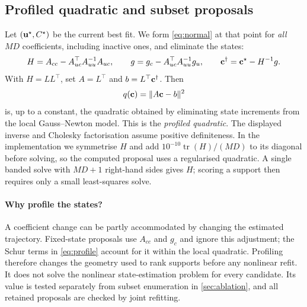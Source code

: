 \subsection{Profiled quadratic and subset proposals}
\label{sec:proposals}
Let $(\mathbf{u}^\star, C^\star)$ be the current best fit. We form \eqref{eq:normal} at that point for \emph{all} $MD$ coefficients, including inactive ones, and eliminate the states:
\begin{equation}
H = A_{cc}-A_{uc}^\top A_{uu}^{-1}A_{uc},\qquad g = g_c - A_{uc}^\top A_{uu}^{-1}g_u,\qquad
\mathbf{c}^\dagger = \mathbf{c}^\star - H^{-1}g .
\label{eq:profile}
\end{equation}
With $H=LL^\top$, set $A=L^\top$ and $b=L^\top\mathbf{c}^\dagger$. Then
\begin{equation}
q(\mathbf{c}) = \lVert A\mathbf{c}-b\rVert^2
\end{equation}
is, up to a constant, the quadratic obtained by eliminating state increments from the local Gauss--Newton model. This is the \emph{profiled quadratic}. The displayed inverse and Cholesky factorisation assume positive definiteness. In the implementation we symmetrise $H$ and add $10^{-10}\operatorname{tr}(H)/(MD)$ to its diagonal before solving, so the computed proposal uses a regularised quadratic. A single banded solve with $MD+1$ right-hand sides gives $H$; scoring a support then requires only a small least-squares solve.

\paragraph{Why profile the states?} A coefficient change can be partly accommodated by changing the estimated trajectory. Fixed-state proposals use $A_{cc}$ and $g_c$ and ignore this adjustment; the Schur terms in \eqref{eq:profile} account for it within the local quadratic. Profiling therefore changes the geometry used to rank supports before any nonlinear refit. It does not solve the nonlinear state-estimation problem for every candidate. Its value is tested separately from subset enumeration in \cref{sec:ablation}, and all retained proposals are checked by joint refitting.

